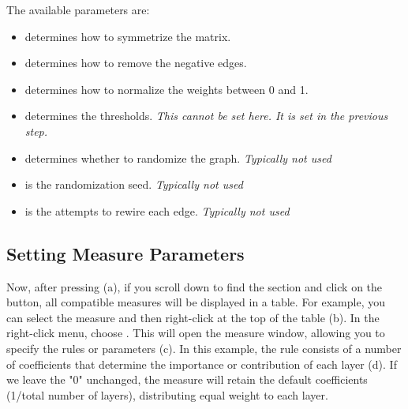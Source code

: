 \documentclass[justified]{tufte-handout}
\begin{document}
The available parameters are:
\begin{itemize}
	\item {} determines how to symmetrize the matrix.
	\item {} determines how to remove the negative edges.
	\item {} determines how to normalize the weights between 0 and 1.
	\item {} determines the thresholds. \emph{This cannot be set here. It is set in the previous step.}
	\item {} determines whether to randomize the graph. \emph{Typically not used}
	\item {} is the randomization seed. \emph{Typically not used}
	\item {} is the attempts to rewire each edge. \emph{Typically not used}
\end{itemize}

\subsection{Setting Measure Parameters}

Now, after pressing  (a), if you scroll down to find the  section and click on the  button, all compatible measures will be displayed in a table. 
For example, you can select the  measure and then right-click at the top of the table (b). In the right-click menu, choose . 
This will open the measure window, allowing you to specify the rules or parameters (c). In this example, the rule consists of a number of coefficients that determine the importance or contribution of each layer (d). If we leave the "0" unchanged, the measure will retain the default coefficients (1/total number of layers), distributing equal weight to each layer.
\end{document}
